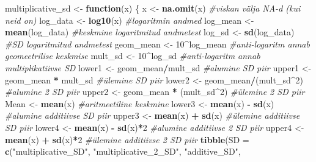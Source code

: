 \documentclass[]{book}
\newenvironment{Shaded}{\begin{snugshade}}{\end{snugshade}}
\newcommand{\CommentTok}[1]{\textcolor[rgb]{0.56,0.35,0.01}{\textit{#1}}}
\newcommand{\ControlFlowTok}[1]{\textcolor[rgb]{0.13,0.29,0.53}{\textbf{#1}}}
\newcommand{\DataTypeTok}[1]{\textcolor[rgb]{0.13,0.29,0.53}{#1}}
\newcommand{\DecValTok}[1]{\textcolor[rgb]{0.00,0.00,0.81}{#1}}
\newcommand{\KeywordTok}[1]{\textcolor[rgb]{0.13,0.29,0.53}{\textbf{#1}}}
\newcommand{\NormalTok}[1]{#1}
\newcommand{\OperatorTok}[1]{\textcolor[rgb]{0.81,0.36,0.00}{\textbf{#1}}}
\newcommand{\StringTok}[1]{\textcolor[rgb]{0.31,0.60,0.02}{#1}}
\begin{document}
\begin{Shaded}
\begin{Highlighting}[]
\NormalTok{multiplicative_sd <-}\StringTok{ }\ControlFlowTok{function}\NormalTok{(x) \{}
\NormalTok{  x <-}\StringTok{ }\KeywordTok{na.omit}\NormalTok{(x) }\CommentTok{#viskan välja NA-d (kui neid on)}
\NormalTok{  log_data <-}\StringTok{ }\KeywordTok{log10}\NormalTok{(x) }\CommentTok{#logaritmin andmed}
\NormalTok{  log_mean <-}\StringTok{ }\KeywordTok{mean}\NormalTok{(log_data) }\CommentTok{#keskmine logaritmitud andmetest}
\NormalTok{  log_sd <-}\StringTok{ }\KeywordTok{sd}\NormalTok{(log_data) }\CommentTok{#SD logaritmitud andmetest}
\NormalTok{  geom_mean <-}\StringTok{ }\DecValTok{10}\OperatorTok{^}\NormalTok{log_mean }\CommentTok{#anti-logaritm annab geomeetrilise keskmise}
\NormalTok{  mult_sd <-}\StringTok{ }\DecValTok{10}\OperatorTok{^}\NormalTok{log_sd }\CommentTok{#anti-logaritm annab multiplikatiivse SD}
\NormalTok{  lower1 <-}\StringTok{ }\NormalTok{geom_mean}\OperatorTok{/}\NormalTok{mult_sd }\CommentTok{#alumine SD piir}
\NormalTok{  upper1 <-}\StringTok{ }\NormalTok{geom_mean }\OperatorTok{*}\StringTok{ }\NormalTok{mult_sd }\CommentTok{#ülemine SD piir}
\NormalTok{  lower2 <-}\StringTok{ }\NormalTok{geom_mean}\OperatorTok{/}\NormalTok{(mult_sd}\OperatorTok{^}\DecValTok{2}\NormalTok{) }\CommentTok{#alumine 2 SD piir}
\NormalTok{  upper2 <-}\StringTok{ }\NormalTok{geom_mean }\OperatorTok{*}\StringTok{ }\NormalTok{(mult_sd}\OperatorTok{^}\DecValTok{2}\NormalTok{) }\CommentTok{#ülemine 2 SD piir}
\NormalTok{  Mean <-}\StringTok{ }\KeywordTok{mean}\NormalTok{(x) }\CommentTok{#aritmeetiline keskmine}
\NormalTok{  lower3 <-}\StringTok{ }\KeywordTok{mean}\NormalTok{(x) }\OperatorTok{-}\StringTok{ }\KeywordTok{sd}\NormalTok{(x) }\CommentTok{#alumine additiivse SD piir}
\NormalTok{  upper3 <-}\StringTok{ }\KeywordTok{mean}\NormalTok{(x) }\OperatorTok{+}\StringTok{ }\KeywordTok{sd}\NormalTok{(x) }\CommentTok{#ülemine additiivse SD piir}
\NormalTok{  lower4 <-}\StringTok{ }\KeywordTok{mean}\NormalTok{(x) }\OperatorTok{-}\StringTok{ }\KeywordTok{sd}\NormalTok{(x)}\OperatorTok{*}\DecValTok{2} \CommentTok{#alumine additiivse 2 SD piir}
\NormalTok{  upper4 <-}\StringTok{ }\KeywordTok{mean}\NormalTok{(x) }\OperatorTok{+}\StringTok{ }\KeywordTok{sd}\NormalTok{(x)}\OperatorTok{*}\DecValTok{2} \CommentTok{#ülemine additiivse 2 SD piir}
  \KeywordTok{tibble}\NormalTok{(}\DataTypeTok{SD =} \KeywordTok{c}\NormalTok{(}\StringTok{"multiplicative_SD"}\NormalTok{, }
                \StringTok{"multiplicative_2_SD"}\NormalTok{, }
                \StringTok{"additive_SD"}\NormalTok{, }

\end{Highlighting}
\end{Shaded}
\end{document}
